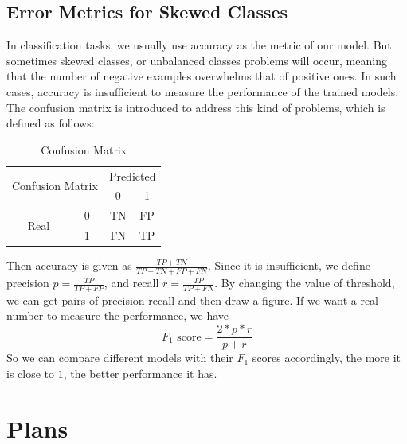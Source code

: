 \documentclass{article} %
\begin{document}
\subsection{Error Metrics for Skewed Classes}
In classification tasks, we usually use accuracy as the metric of our model. But sometimes skewed classes, or unbalanced classes problems will occur, meaning that the number of negative examples overwhelms that of positive ones. In such cases, accuracy is insufficient to measure the performance of the trained models. The confusion matrix is introduced to address this kind of problems, which is defined as follows:

\begin{table}[h]
  \centering
  \begin{tabular}{|c|c|cc|}
    \hline
    \multicolumn{2}{|c|}{\multirow{2}{*}{Confusion Matrix}} & \multicolumn{2}{c|}{Predicted}\\
    \cline{3-4}
    \multicolumn{2}{|c|}{} &  0 & 1\\
    \hline
    \multicolumn{1}{|c|}{\multirow{2}{*}{Real}} & 0 & TN & FP\\
     & 1 & FN & TP\\
    \hline
  \end{tabular}
  \caption{Confusion Matrix}\label{tab:confusion-matrix}
\end{table}

Then accuracy is given as $\frac{TP+TN}{TP+TN+FP+FN}$. Since it is insufficient, we define precision $p=\frac{TP}{TP+FP}$, and recall $r=\frac{TP}{TP+FN}$. By changing the value of threshold, we can get pairs of precision-recall and then draw a figure. If we want a real number to measure the performance, we have 
$$F_1 \text{ score} = \frac{2*p*r}{p+r}$$
So we can compare different models with their $F_1$ scores accordingly, the more it is close to $1$, the better performance it has.


\section{Plans}
\end{document}
